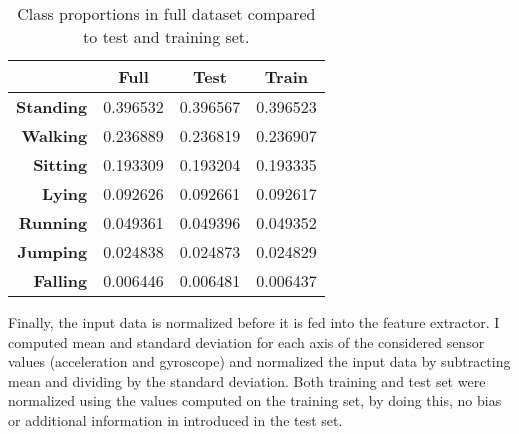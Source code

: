 \begin{table}[!htbp]
\footnotesize
\captionsetup{font=scriptsize, justification=centering}
\centering
\begin{tabular}{r|c|c|c|}
\cline{2-4}
 & \textbf{Full} & \textbf{Test} & \textbf{Train} \\ \hline
\multicolumn{1}{|r|}{\textbf{Standing}} & 0.396532 & 0.396567 & 0.396523 \\ \hline
\multicolumn{1}{|r|}{\textbf{Walking}} & 0.236889 & 0.236819 & 0.236907 \\ \hline
\multicolumn{1}{|r|}{\textbf{Sitting}} & 0.193309 & 0.193204 & 0.193335 \\ \hline
\multicolumn{1}{|r|}{\textbf{Lying}} & 0.092626 & 0.092661 & 0.092617 \\ \hline
\multicolumn{1}{|r|}{\textbf{Running}} & 0.049361 & 0.049396 & 0.049352 \\ \hline
\multicolumn{1}{|r|}{\textbf{Jumping}} & 0.024838 & 0.024873 & 0.024829 \\ \hline
\multicolumn{1}{|r|}{\textbf{Falling}} & 0.006446 & 0.006481 & 0.006437 \\ \hline
\end{tabular}
\caption{Class proportions in full dataset compared to test and training set.}
\label{test_train_prop_table}
\end{table}

Finally, the input data is normalized before it is fed into the feature extractor. I computed mean and standard deviation for each axis of the considered sensor values (acceleration and gyroscope) and normalized the input data by subtracting mean and dividing by the standard deviation. Both training and test set were normalized using the values computed on the training set, by doing this, no bias or additional information in introduced in the test set.

